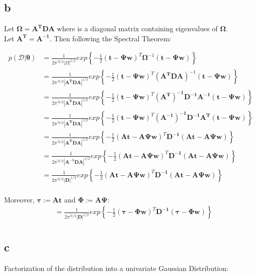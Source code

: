 \documentclass[a4paper]{article}
\begin{document}
\subsection*{b}
Let $\pmb{\Omega} = \pmb{A^{T}DA}$ where  is a diagonal matrix containing eigenvalues of $\pmb{\Omega}$.\\
Let $\pmb{A^{T} = A^{-1}}$. Then following the Spectral Theorem:

\begin{align*}
    p(\mathcal{D}|\pmb{\theta}) &= \frac{1}{2\pi^{N/2}|\Omega|^{1/2}}exp\left\{-\frac{1}{2}(\pmb{t}-\pmb{\Psi w})^{T}\pmb{\Omega}^{-1}(\pmb{t}-\pmb{\Psi w}) \right\} \\
    &= \frac{1}{2\pi^{N/2}|\pmb{A^TDA}|^{1/2}}exp\left\{-\frac{1}{2}(\pmb{t}-\pmb{\Psi w})^{T}(\pmb{A^TDA})^{-1}(\pmb{t}-\pmb{\Psi w})  \right\} \\
    &= \frac{1}{2\pi^{N/2}|\pmb{A^TDA}|^{1/2}}exp\left\{-\frac{1}{2}(\pmb{t}-\pmb{\Psi w})^{T}\pmb{(A^{T})^{-1}D^{-1}A^{-1}}(\pmb{t}-\pmb{\Psi w})  \right\} \\
    &= \frac{1}{2\pi^{N/2}|\pmb{A^TDA}|^{1/2}}exp\left\{-\frac{1}{2}(\pmb{t}-\pmb{\Psi w})^{T}\pmb{(A^{-1})^{-1}D^{-1}A^{T}}(\pmb{t}-\pmb{\Psi w})  \right\} \\
    &= \frac{1}{2\pi^{N/2}|\pmb{A^TDA}|^{1/2}}exp\left\{-\frac{1}{2}(\pmb{At}-\pmb{A\Psi w})^{T}\pmb{D^{-1}}(\pmb{At}-\pmb{A\Psi w})  \right\} \\
    &= \frac{1}{2\pi^{N/2}|\pmb{A^{-1}DA}|^{1/2}}exp\left\{-\frac{1}{2}(\pmb{At}-\pmb{A\Psi w})^{T}\pmb{D^{-1}}(\pmb{At}-\pmb{A\Psi w})  \right\} \\
    &= \frac{1}{2\pi^{N/2}|\pmb{D}|^{1/2}}exp\left\{-\frac{1}{2}(\pmb{At}-\pmb{A\Psi w})^{T}\pmb{D^{-1}}(\pmb{At}-\pmb{A\Psi w}) \right\} \\
\end{align*}{}

Moreover, $\pmb{\tau :=At} $ and $\pmb{\Phi :=A\Psi}$:
\begin{align*}
    &= \frac{1}{2\pi^{N/2}|\pmb{D}|^{1/2}}exp\left\{-\frac{1}{2}(\pmb{\tau}-\pmb{\Phi w})^{T}\pmb{D^{-1}}(\pmb{\tau}-\pmb{\Phi w})  \right\} \\
\end{align*}{}

\subsection*{c}
Factorization of the distribution into a univariate Gaussian Distribution:
\end{document}

